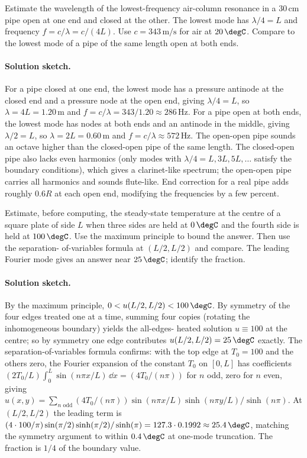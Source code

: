 \begin{exercise}
Estimate the wavelength of the lowest-frequency air-column resonance
in a $30\,\si{\centi\meter}$ pipe open at one end and closed at
the other. The lowest mode has $\lambda/4 = L$ and frequency $f =
c/\lambda = c/(4L)$. Use $c = 343\,\si{\meter\per\second}$ for
air at $20\,\degC$. Compare to the lowest mode of a pipe of the
same length open at both ends.

\paragraph{Solution sketch.}
For a pipe closed at one end, the lowest mode has a pressure
antinode at the closed end and a pressure node at the open end,
giving $\lambda/4 = L$, so $\lambda = 4 L = 1.20\,\si{\meter}$
and $f = c/\lambda = 343/1.20 \approx 286\,\si{\hertz}$. For a
pipe open at both ends, the lowest mode has nodes at both ends
and an antinode in the middle, giving $\lambda/2 = L$, so
$\lambda = 2 L = 0.60\,\si{\meter}$ and $f = c/\lambda \approx
572\,\si{\hertz}$. The open-open pipe sounds an octave higher
than the closed-open pipe of the same length. The closed-open
pipe also lacks even harmonics (only modes with $\lambda/4 = L,
3L, 5L, \ldots$ satisfy the boundary conditions), which gives a
clarinet-like spectrum; the open-open pipe carries all harmonics
and sounds flute-like. End correction for a real pipe adds
roughly $0.6 R$ at each open end, modifying the frequencies by a
few percent.
\end{exercise}

\begin{exercise}
Estimate, before computing, the steady-state temperature at the
centre of a square plate of side $L$ when three sides are held at
$0\,\degC$ and the fourth side is held at $100\,\degC$. Use the
maximum principle to bound the answer. Then use the separation-
of-variables formula at $(L/2, L/2)$ and compare. The leading
Fourier mode gives an answer near $25\,\degC$; identify the
fraction.

\paragraph{Solution sketch.}
By the maximum principle, $0 < u(L/2, L/2) < 100\,\degC$. By
symmetry of the four edges treated one at a time, summing four
copies (rotating the inhomogeneous boundary) yields the all-edges-
heated solution $u \equiv 100$ at the centre; so by symmetry one
edge contributes $u(L/2, L/2) = 25\,\degC$ exactly. The
separation-of-variables formula confirms: with the top edge at
$T_{0} = 100$ and the others zero, the Fourier expansion of the
constant $T_{0}$ on $[0, L]$ has coefficients $(2T_{0}/L)
\int_{0}^{L} \sin(n\pi x/L)\,\dd x = (4 T_{0}/(n\pi))$ for $n$
odd, zero for $n$ even, giving $u(x, y) = \sum_{n\text{ odd}}
(4 T_{0}/(n\pi)) \sin(n\pi x/L) \sinh(n\pi y/L)/\sinh(n\pi)$. At
$(L/2, L/2)$ the leading term is $(4 \cdot 100/\pi) \sin(\pi/2)
\sinh(\pi/2)/\sinh(\pi) = 127.3 \cdot 0.1992 \approx 25.4\,\degC$,
matching the symmetry argument to within $0.4\,\degC$ at one-mode
truncation. The fraction is $1/4$ of the boundary value.
\end{exercise}

